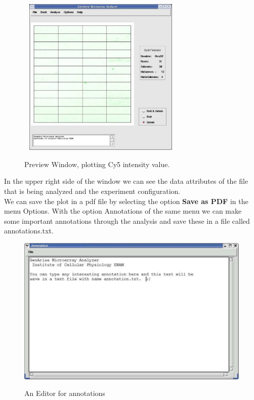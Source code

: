 \documentclass[12pt]{article}
\begin{document}
\textbf{\\\\}
\begin{figure}[h]
\begin{center}
\includegraphics[height=3in,width=3.15in]{./images/principalGreen.pdf}\\
\caption{Preview Window, plotting Cy5 intensity value. \label{fig5}}
\end{center}
\end{figure}

In the upper right side of the window we can see the data attributes of the file that is being analyzed and the experiment configuration.\\
We can save the plot in a pdf file by selecting the option \textbf{Save as PDF} in the menu Options. With the option Annotations of the same menu we can make some important annotations through the analysis and save these in a file called annotations.txt.
\begin{figure}[h]
\begin{center}
\includegraphics[scale= 0.3]{./images/annotation.pdf}\\
\caption{An Editor for annotations\label{fig6}}
\end{center}
\end{figure}
\end{document}
